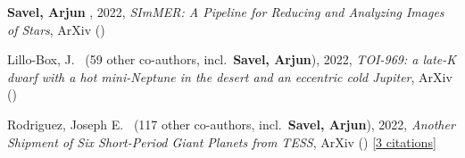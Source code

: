 \item[{\color{numcolor}\scriptsize3}] \textbf{Savel, Arjun} \etal, 2022, \emph{SImMER: A Pipeline for Reducing and Analyzing Images of Stars}, ArXiv ()

\item[{\color{numcolor}\scriptsize2}] Lillo-Box, J. \etal\ ({59} other co-authors, incl.\ \textbf{Savel, Arjun}), 2022, \emph{TOI-969: a late-K dwarf with a hot mini-Neptune in the desert and an eccentric cold Jupiter}, ArXiv ()

\item[{\color{numcolor}\scriptsize1}] Rodriguez, Joseph E. \etal\ ({117} other co-authors, incl.\ \textbf{Savel, Arjun}), 2022, \emph{Another Shipment of Six Short-Period Giant Planets from TESS}, ArXiv () [\href{https://ui.adsabs.harvard.edu/abs/2022arXiv220505709R}{3 citations}]